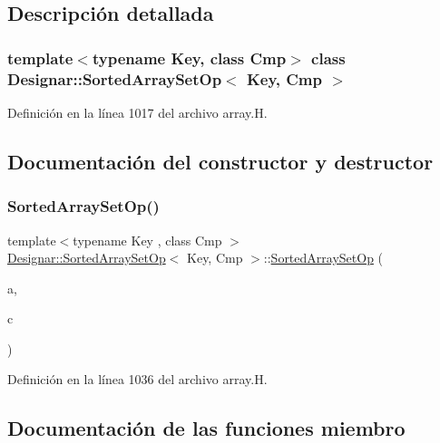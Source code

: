 \subsection{Descripción detallada}
\subsubsection*{template$<$typename Key, class Cmp$>$\newline
class Designar\+::\+Sorted\+Array\+Set\+Op$<$ Key, Cmp $>$}



Definición en la línea 1017 del archivo array.\+H.



\subsection{Documentación del constructor y destructor}
\mbox{\label{class_designar_1_1_sorted_array_set_op_a2d732318892f21ead8d988b5a76a016b}} 
\subsubsection{\texorpdfstring{Sorted\+Array\+Set\+Op()}{SortedArraySetOp()}}
{\footnotesize\ttfamily template$<$typename Key , class Cmp $>$ \\
\hyperlink{class_designar_1_1_sorted_array_set_op}{Designar\+::\+Sorted\+Array\+Set\+Op}$<$ Key, Cmp $>$\+::\hyperlink{class_designar_1_1_sorted_array_set_op}{Sorted\+Array\+Set\+Op} (\begin{DoxyParamCaption}\item[{\hyperlink{class_designar_1_1_dyn_array}{Dyn\+Array}$<$ Key $>$ \&}]{a,  }\item[{Cmp \&}]{c }\end{DoxyParamCaption})\hspace{0.3cm}{\ttfamily [inline]}}



Definición en la línea 1036 del archivo array.\+H.



\subsection{Documentación de las funciones miembro}
\mbox{\label{class_designar_1_1_sorted_array_set_op_adef257a4a2debcef385f570b1cd72037}} 
